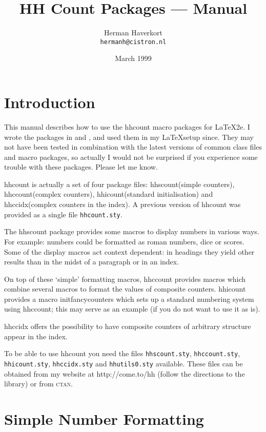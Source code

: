 \documentclass[11pt]{article}
\title{HH Count Packages --- Manual}
\author{Herman Haverkort\\\normalsize\normalfont\texttt{hermanh@cistron.nl}}
\date{March 1999}
\makeatletter
\def\0#1.{\oldstylenums{#1}}           %
\def\packagename#1{{\sffamily #1}}     %
\def\macroname#1{{\ttfamily\@ttbs#1}}  %
\def\hhcount{\packagename{hhcount}\xspace}
\def\hhscount{\packagename{hhscount}\xspace}
\def\hhccount{\packagename{hhccount}\xspace}
\def\hhicount{\packagename{hhicount}\xspace}
\def\hhccidx{\packagename{hhccidx}\xspace}
\def\<#1>{\macroname{#1}}
\makeatother
\begin{document}
\maketitle

\tableofcontents

\section{Introduction}

This manual describes how to use the \hhcount macro packages for
\LaTeX2e. I wrote the packages in \01995. and \01996., and used
them in my \LaTeX setup since. They may not have been tested
in combination with the latest versions of common class files and
macro packages, so actually I would not be surprised if you
experience some trouble with these packages. Please let me know.

\hhcount is actually a set of four package files: \hhscount (simple counters),
\hhccount (complex counters), \hhicount (standard initialisation) and
\hhccidx (complex counters in the index). A previous version of \hhcount
was provided as a single file \texttt{hhcount.sty}.

The \hhscount package provides some macros to display numbers in various
ways. For example: numbers could be formatted as roman numbers, dice or
scores. Some of the display macros act context dependent: in headings
they yield other results than in the midst of a paragraph or in an
index.

On top of these `simple' formatting macros, \hhccount
provides macros which combine several macros
to format the values of composite counters. \hhicount provides
a macro \<initfancycounters> which sets up a standard
numbering system using \hhccount; this may serve as an example
(if you do not want to use it as is).

\hhccidx offers the possibility to have composite counters of
arbitrary structure appear in the index.

To be able to use \hhcount you need the files
\texttt{hhscount.sty}, \texttt{hhccount.sty}, \texttt{hhicount.sty},
\texttt{hhccidx.sty} and \texttt{hhutils0.sty} available.
These files can be obtained from my website at http://come.to/hh
(follow the directions to the library) or from \textsc{ctan}.

\section{Simple Number Formatting}\label{sec:snf}
\end{document}
